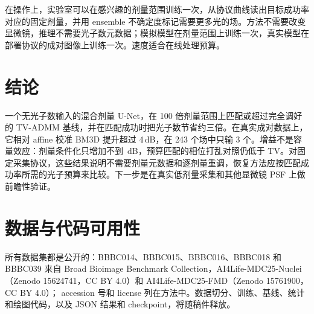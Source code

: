 \documentclass[11pt]{ctexart}
\begin{document}
在操作上，实验室可以在感兴趣的剂量范围训练一次，从协议曲线读出目标成功率对应的固定剂量，并用 ensemble 不确定度标记需要更多光的场。方法不需要改变显微镜，推理不需要光子数元数据；模拟模型在剂量范围上训练一次，真实模型在部署协议的成对图像上训练一次。速度适合在线处理预算。

\section{结论}
一个无光子数输入的混合剂量 U-Net，在 100 倍剂量范围上匹配或超过完全调好的 TV-ADMM 基线，并在匹配成功时把光子数节省约三倍。在真实成对数据上，它相对 affine 校准 BM3D 提升超过 4\,dB，在 243 个场中只输 3 个。增益不是容量效应：剂量条件化只增加不到 \CondStrongDelta\,dB，预算匹配的相位打乱对照仍低于 TV。对固定采集协议，这些结果说明不需要剂量元数据和逐剂量重调，恢复方法应按匹配成功率所需的光子预算来比较。下一步是在真实低剂量采集和其他显微镜 PSF 上做前瞻性验证。

\section*{数据与代码可用性}
所有数据集都是公开的：BBBC014、BBBC015、BBBC016、BBBC018 和 BBBC039 来自 Broad Bioimage Benchmark Collection\cite{ljosa2012bbbc}，AI4Life-MDC25-Nuclei\cite{ai4life_mdc25_2025}（Zenodo 15624741，CC BY 4.0）和 AI4Life-MDC25-FMD\cite{ai4life_mdc25_fmd_2025}（Zenodo 15761900，CC BY 4.0）； accession 号和 license 列在方法中。数据切分、训练、基线、统计和绘图代码，以及 JSON 结果和 checkpoint，将随稿件释放。

\begingroup
\small


\endgroup
\end{document}
